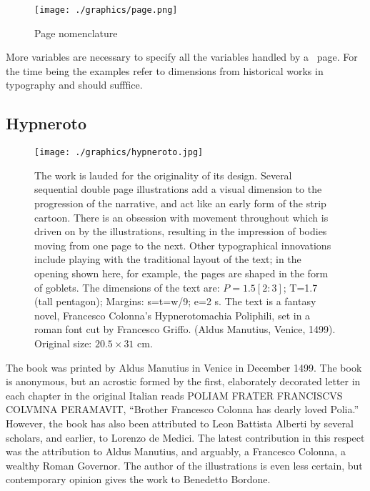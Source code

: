 \begin{figure}
  \texttt{[image: ./graphics/page.png]}
  \caption{Page nomenclature}
   \label{fig:marginfig1}
\end{figure}

More variables are necessary to specify all the variables handled by a \latex\
page. For the time being the examples refer to dimensions from historical works
in typography and should sufffice.

\subsection{Hypneroto}

\begin{figure}[htbp]
\centering
  \texttt{[image: ./graphics/hypneroto.jpg]}
\caption{The work is lauded for the originality of its
design. Several sequential double page
illustrations add a visual dimension to the
progression of the narrative, and act like an
early form of the strip cartoon. There is an
obsession with movement throughout which is driven
on by the illustrations, resulting in the
impression of bodies moving from one page to the
next. Other typographical innovations include
playing with the traditional layout of the text;
in the opening shown here, for example, the pages
are shaped in the form of goblets. The dimensions
of the text are: $P=1.5[2:3]$; T=1.7 (tall pentagon);
Margins: s=t=w/9; e=2 s. The text is a fantasy
novel, Francesco Colonna's Hypnerotomachia
Poliphili, set in a roman font cut by Francesco
Griffo. (Aldus Manutius, Venice, 1499). Original
size: $20.5 \times 31$ cm.}
\label{fig:hypneroto}
\end{figure}





The book was printed by Aldus Manutius in Venice in December 1499. The book is anonymous, but an acrostic formed by the first, elaborately decorated letter in each chapter in the original Italian reads \textsc{\small POLIAM FRATER FRANCISCVS COLVMNA PERAMAVIT}, \enquote{Brother Francesco Colonna has dearly loved Polia.} However, the book has also been attributed to Leon Battista Alberti by several scholars, and earlier, to Lorenzo de Medici. The latest contribution in this respect was the attribution to Aldus Manutius, and arguably, a Francesco Colonna, a wealthy Roman Governor. The author of the illustrations is even less certain, but contemporary opinion gives the work to Benedetto Bordone.




